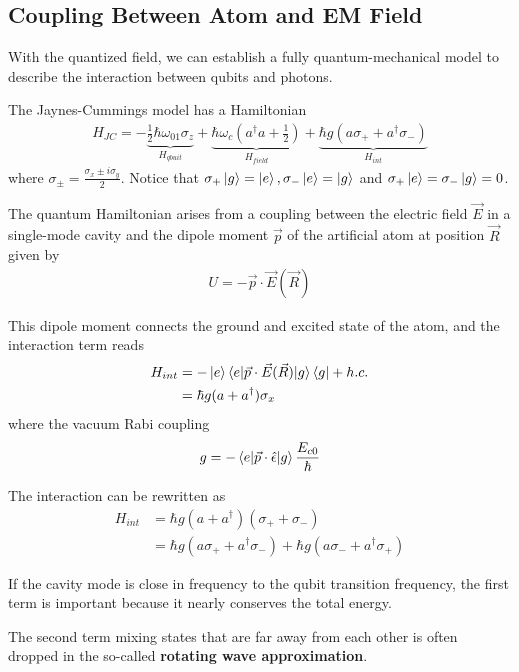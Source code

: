 \subsection{Coupling Between Atom and EM Field}
With the quantized field, we can establish a fully quantum-mechanical model to describe the interaction between qubits and photons.

The Jaynes-Cummings model has a Hamiltonian
\begin{align*}
    H_{JC}=-\underbrace{{\frac{1}{2}\hbar\omega_{01}\sigma_z}}_{H_{qbuit}} + \underbrace{\hbar \omega_c\left(a^\dagger a +\frac{1}{2}\right)}_{H_{field}} + \underbrace{\hbar g (a\sigma_+ + a^\dagger \sigma_-)}_{H_{int}}
\end{align*}
where $\sigma_\pm=\frac{\sigma_x \pm i\sigma_y}{2}$. Notice that $\sigma_+\ket{g}=\ket{e}, \sigma_-\ket{e}=\ket{g}$ and $\sigma_+\ket{e}=\sigma_-\ket{g}=0$. 

The quantum Hamiltonian arises from a coupling between the electric field $\vec{E}$ in a single-mode cavity and the dipole moment $\vec{p}$ of the artificial atom at position $\vec{R}$ given by
\begin{align*}
    U=-\vec{p}\cdot\vec{E}(\vec{R})
\end{align*}

This dipole moment connects the ground and excited state of the atom, and the interaction term reads
\begin{align*}
    H_{int}&=-\ket{e}\braket{e|\vec{p}\cdot\vec{E}(\vec{R})|g}\bra{g}+h.c.\\
    &=\hbar g (a+a^\dagger)\sigma_x
\end{align*}
where the vacuum Rabi coupling
\begin{align*}
    g=-\braket{e|\vec{p}\cdot \hat{\epsilon}|g}\frac{E_{c0}}{\hbar}
\end{align*}

The interaction can be rewritten as
\begin{align*}
    H_{int}&= \hbar g (a+a^\dagger)(\sigma_+ + \sigma_-)\\
    &=\hbar g (a\sigma_+ + a^\dagger \sigma_-)+\hbar g (a\sigma_- + a^\dagger \sigma_+)
\end{align*}

If the cavity mode is close in frequency to the qubit transition frequency, the first term is important because it nearly conserves the total energy. 

The second term mixing states that are far away from each other is often dropped in the so-called \textbf{rotating wave approximation}.

